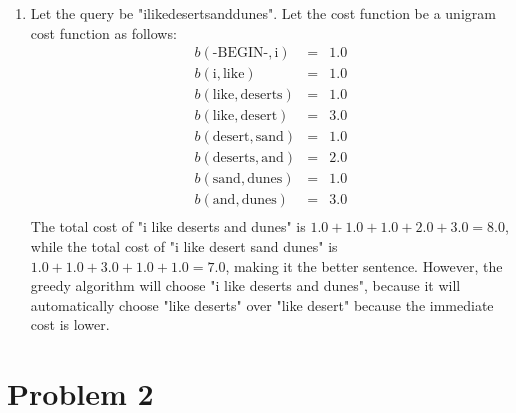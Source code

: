 \documentclass[12pt]{article}
\begin{document}
\begin{enumerate}[label=(\alph*)]
  \item Let the query be "ilikedesertsanddunes". Let the cost function be a unigram cost function as follows:
  \begin{eqnarray*}
  b(\text{-BEGIN-}, \text{i}) &=& 1.0\\
  b(\text{i}, \text{like}) &=& 1.0\\
  b(\text{like}, \text{deserts}) &=& 1.0\\
  b(\text{like}, \text{desert}) &=& 3.0\\
  b(\text{desert}, \text{sand}) &=& 1.0\\
  b(\text{deserts}, \text{and}) &=& 2.0\\
  b(\text{sand}, \text{dunes}) &=& 1.0\\
  b(\text{and}, \text{dunes}) &=& 3.0\\
  \end{eqnarray*}
  The total cost of "i like deserts and dunes" is $1.0 + 1.0 + 1.0 + 2.0 + 3.0 = 8.0$, while the total cost of "i like desert sand dunes" is $1.0 + 1.0 + 3.0 + 1.0 + 1.0 = 7.0$, making it the better sentence. However, the greedy algorithm will choose "i like deserts and dunes", because it will automatically choose "like deserts" over "like desert" because the immediate cost is lower. 
\end{enumerate}

\section*{Problem 2}
\end{document}
